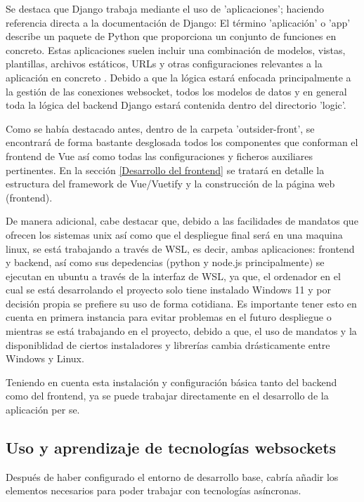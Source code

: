 Se destaca que Django trabaja mediante el uso de 'aplicaciones'; haciendo referencia directa a la documentación de Django: 
El término 'aplicación' o 'app' describe un paquete de Python que proporciona un conjunto de funciones en concreto. 
Estas aplicaciones suelen incluir una combinación de modelos, vistas, 
plantillas, archivos estáticos, URLs y otras configuraciones relevantes a la aplicación en concreto \cite{django}. Debido a que 
la lógica estará enfocada principalmente a la gestión de las conexiones websocket, todos los modelos de datos y en general toda 
la lógica del backend Django estará contenida dentro del directorio 'logic'.

Como se había destacado antes, dentro de la carpeta 'outsider-front', se encontrará de forma bastante desglosada todos los componentes
que conforman el frontend de Vue así como todas las configuraciones y ficheros auxiliares pertinentes. En la sección \ref{Desarrollo del frontend}
se tratará en detalle la estructura del framework de Vue/Vuetify y la construcción de la página web (frontend).

De manera adicional, cabe destacar que, debido a las facilidades de mandatos que ofrecen los sistemas unix así como que el despliegue
final será en una maquina linux, se está trabajando a través de WSL, es decir,
ambas aplicaciones: frontend y backend, así como sus depedencias (python y node.js principalmente) se ejecutan en ubuntu a través de la interfaz
de WSL, ya que, el ordenador en el cual se está desarrolando el proyecto solo tiene instalado Windows 11 y por decisión propia se prefiere su uso de forma
cotidiana. Es importante tener esto en cuenta en primera instancia para evitar problemas en el futuro despliegue o mientras se está trabajando en el proyecto,
debido a que, el uso de mandatos y la disponiblidad de ciertos instaladores y librerías cambia drásticamente entre Windows y Linux.

Teniendo en cuenta esta instalación y configuración básica tanto del backend como del frontend, ya se puede trabajar directamente en el desarrollo de
la aplicación per se.

\subsection{Uso y aprendizaje de tecnologías websockets} 

Después de haber configurado el entorno de desarrollo base, cabría añadir los elementos necesarios para poder 
trabajar con tecnologías asíncronas.


